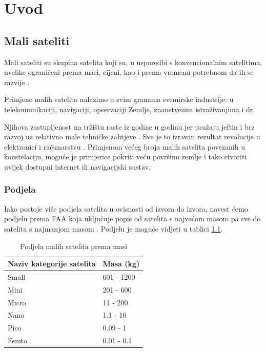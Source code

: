 \documentclass[times, utf8, diplomski, numeric]{templates/template}
\begin{document}
\chapter{Uvod}{
    \section{Mali sateliti}{
        Mali sateliti  su skupina satelita koji su, u usporedbi s konvencionalnim satelitima, uvelike ograničeni prema masi, cijeni, kao i prema vremenu potrebnom da ih se razvije \cite{hrvatskiVojnik}.

        Primjene malih satelita nalazimo u svim granama svemirske industrije: u telekomunikaciji, navigaciji, opservaciji Zemlje, znanstvenim istraživanjima i dr.
        
        Njihova zastupljenost na tržištu raste iz godine u godinu jer pružaju jeftin i brz razvoj uz relativno male tehničke zahtjeve \cite{rastMalihSatelita}. Sve je to izravan rezultat revolucije u elektronici i računarstvu \cite{hrvatskiVojnik}. Primjenom većeg broja malih satelita povezanih u konstelaciju, moguće je primjerice pokriti veću površinu zemlje i tako stvoriti uvijek dostupni internet ili navigacijski sustav.
        
        \subsection{Podjela}{
            Iako postoje više podjela satelita u ovisnosti od izvora do izvora, navest ćemo podjelu prema FAA  koja uključuje popis od satelita s najvećom masom pa sve do satelita s najmanjom masom \cite{podjelaPremaMasi}. Podjelu je moguće vidjeti u tablici \ref{tbl:podjelaSatelita}.

            \begin{table}[htb]
            \caption{Podjela malih satelita prema masi}
            \label{tbl:podjelaSatelita}
            \centering
            \begin{tabular}{ll} \toprule
            Naziv kategorije satelita & Masa (kg) \\ \midrule
            Small & 601 - 1200 \\
            Mini & 201 - 600 \\
            Micro & 11 - 200 \\
            Nano & 1.1 - 10 \\
            Pico & 0.09 - 1 \\
            Femto & 0.01 - 0.1 \\ \bottomrule
            \end{tabular}
            \end{table}

}}}
\end{document}
